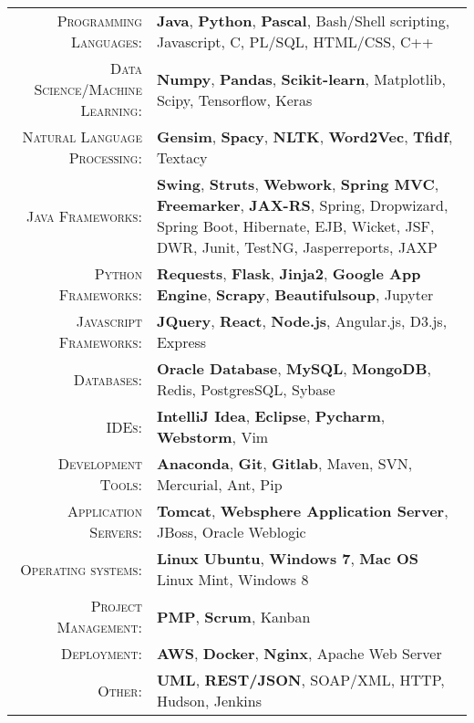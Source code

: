 %
%
%

\renewcommand{\arraystretch}{1.1}
	\begin{tabular}{>{}r>{}p{13cm}} 
		\textsc{Programming Languages:}  		&   \textbf{Java}, \textbf{Python}, \textbf{Pascal}, Bash/Shell scripting, Javascript, C, PL/SQL,  HTML/CSS, C++\\ 
		\textsc{Data Science/Machine Learning:}                  &   \textbf{Numpy}, \textbf{Pandas}, \textbf{Scikit-learn}, Matplotlib, Scipy, Tensorflow, Keras\\
		\textsc{Natural Language Processing:} 	 & \textbf{Gensim}, \textbf{Spacy}, \textbf{NLTK}, \textbf{Word2Vec}, \textbf{Tfidf}, Textacy\\
		\textsc{Java Frameworks:} 				& \textbf{Swing}, \textbf{Struts}, \textbf{Webwork}, \textbf{Spring MVC}, \textbf{Freemarker}, \textbf{JAX-RS}, Spring, Dropwizard, Spring Boot, Hibernate, EJB, Wicket, JSF, DWR, Junit, TestNG, Jasperreports, JAXP \\
		\textsc{Python Frameworks:} 				& \textbf{Requests}, \textbf{Flask}, \textbf{Jinja2}, \textbf{Google App Engine}, \textbf{Scrapy}, \textbf{Beautifulsoup}, Jupyter\\ 
		\textsc{Javascript Frameworks:} 				& \textbf{JQuery}, \textbf{React}, \textbf{Node.js}, Angular.js, D3.js, Express \\
		\textsc{Databases:}                  &   \textbf{Oracle Database}, \textbf{MySQL}, \textbf{MongoDB}, Redis, PostgresSQL, Sybase \\ 
		\textsc{IDEs:}	  		&   \textbf{IntelliJ Idea}, \textbf{Eclipse}, \textbf{Pycharm}, \textbf{Webstorm}, Vim  \\ 
		\textsc{Development Tools:} & 	  		\textbf{Anaconda}, \textbf{Git}, \textbf{Gitlab}, Maven, SVN, Mercurial, Ant, Pip \\
		\textsc{Application Servers:}				        &   \textbf{Tomcat}, \textbf{Websphere Application Server}, JBoss, Oracle Weblogic \\ 
		\textsc{Operating systems:}	        &   \textbf{Linux Ubuntu}, \textbf{Windows 7}, \textbf{Mac OS} Linux Mint, Windows 8\\ 
		\textsc{Project Management:}				        &   \textbf{PMP}, \textbf{Scrum}, Kanban \\
		\textsc{Deployment:}				        &   \textbf{AWS}, \textbf{Docker}, \textbf{Nginx}, Apache Web Server\\
		\textsc{Other:}					        &   \textbf{UML}, \textbf{REST/JSON}, SOAP/XML, HTTP, Hudson, Jenkins \\
	\end{tabular}